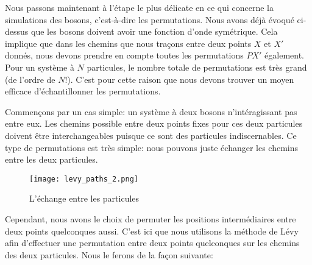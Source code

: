 \documentclass[11pt]{article}
\theoremstyle{definition}
\theoremstyle{remark}
\begin{document}
Nous passons maintenant à l’étape le plus délicate en ce qui concerne la simulations des bosons, c'est-à-dire les permutations. Nous avons déjà évoqué ci-dessus que les bosons doivent avoir une fonction d'onde symétrique. Cela implique que dans les chemins que nous traçons entre deux points $X$ et $X'$ donnés, nous devons prendre en compte toutes les permutations $PX'$ également. Pour un système à $N$ particules, le nombre totale de permutations est très grand (de l'ordre de $N!$). C'est pour cette raison que nous devons trouver un moyen efficace d'échantillonner les permutations. 

Commençons par un cas simple: un système à deux bosons n'intéragissant pas entre eux. Les chemins possible entre deux points fixes pour ces deux particules doivent être interchangeables puisque ce sont des particules indiscernables. Ce type de permutations est très simple: nous pouvons juste échanger les chemins entre les deux particules. 

\begin{figure}[!h]
\label{levy_paths_exchange}
\centering 
\texttt{[image: levy\_paths\_2.png]}
\caption{L'échange entre les particules} 
\end{figure} 

Cependant, nous avons le choix de permuter les positions intermédiaires entre deux points quelconques aussi. C'est ici que nous utilisons la méthode de Lévy afin d’effectuer une permutation entre deux points quelconques sur les chemins des deux particules. Nous le ferons de la façon suivante: 
\end{document}
